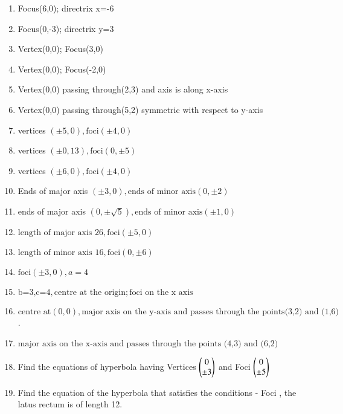 \begin{enumerate}[label=\thesubsection.\arabic*,ref=\thesubsection.\theenumi,resume*]
\item Focus(6,0); directrix x=-6 
\item Focus(0,-3); directrix y=3
\item Vertex(0,0); Focus(3,0)
\item Vertex(0,0); Focus(-2,0) 
\item Vertex(0,0) passing through(2,3) and axis is along x-axis
\item Vertex(0,0) passing through(5,2) symmetric with respect to y-axis
\item vertices $(\pm5,0),\text{foci} (\pm4,0)$
\item vertices $(\pm0,13),\text{foci} (0,\pm5)$
\item vertices $(\pm6,0),\text{foci} (\pm4,0)$
\item Ends of major axis $(\pm3,0),\text{ends of minor axis}(0,\pm2)$
\item  ends of major axis $(0,\pm \sqrt{5}),\text{ends of minor axis} (\pm1,0)$
\item $\text {length of major axis 26},\text{foci} (\pm5,0)$
\item $\text {length of minor axis 16},\text{foci} (0,\pm6)$
\item $\text {foci} (\pm3,0),a=4$
\item $\text {b=3,c=4},\text {centre at the origin} ;\text{foci on the x axis}$
\item $\text {centre at} (0,0),\text{major axis on the y-axis and passes through the points} \text {(3,2) and (1,6)}$.
\\
\solution
\item $\text{major axis on the x-axis and passes through the points (4,3) and (6,2)}$
\\
\solution
\item Find the equations of hyperbola having Vertices $\begin{pmatrix}0\\\pm 3\end{pmatrix}$ and Foci $\begin{pmatrix}0\\\pm5\end{pmatrix}$
	\\
\solution
\item Find the equation of the hyperbola that satisfies the conditions - Foci , the latus rectum is of length 12.
\\
\solution

\end{enumerate}
